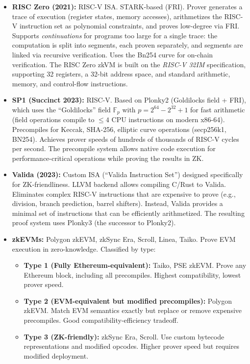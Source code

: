 \begin{itemize}
\item \textbf{RISC Zero (2021):} RISC-V ISA. STARK-based (FRI). Prover generates a trace of execution (register states, memory accesses), arithmetizes the RISC-V instruction set as polynomial constraints, and proves low-degree via FRI. Supports \emph{continuations} for programs too large for a single trace: the computation is split into segments, each proven separately, and segments are linked via recursive verification. Uses the Bn254 curve for on-chain verification. The RISC Zero zkVM is built on the \emph{RISC-V 32IM} specification, supporting 32 registers, a 32-bit address space, and standard arithmetic, memory, and control-flow instructions.

\item \textbf{SP1 (Succinct 2023):} RISC-V. Based on Plonky2 (Goldilocks field + FRI), which uses the ``Goldilocks'' field $\mathbb{F}_p$ with $p = 2^{64} - 2^{32} + 1$ for fast arithmetic (field operations compile to $\le 4$ CPU instructions on modern x86-64). Precompiles for Keccak, SHA-256, elliptic curve operations (secp256k1, BN254). Achieves prover speeds of hundreds of thousands of RISC-V cycles per second. The precompile system allows native code execution for performance-critical operations while proving the results in ZK.

\item \textbf{Valida (2023):} Custom ISA (``Valida Instruction Set'') designed specifically for ZK-friendliness. LLVM backend allows compiling C/Rust to Valida. Eliminates complex RISC-V instructions that are expensive to prove (e.g., division, branch prediction, barrel shifters). Instead, Valida provides a minimal set of instructions that can be efficiently arithmetized. The resulting proof system uses Plonky3 (the successor to Plonky2).

\item \textbf{zkEVMs:} Polygon zkEVM, zkSync Era, Scroll, Linea, Taiko. Prove EVM execution in zero-knowledge. Classified by type:
  \begin{itemize}
  \item \textbf{Type 1 (Fully Ethereum-equivalent):} Taiko, PSE zkEVM. Prove any Ethereum block, including all precompiles. Highest compatibility, lowest prover speed.
  \item \textbf{Type 2 (EVM-equivalent but modified precompiles):} Polygon zkEVM. Match EVM semantics exactly but replace or remove expensive precompiles. Good compatibility-efficiency tradeoff.
  \item \textbf{Type 3 (ZK-friendly):} zkSync Era, Scroll. Use custom bytecode representations and modified opcodes. Higher prover speed but requires modified deployment.
  \end{itemize}


\end{itemize}
